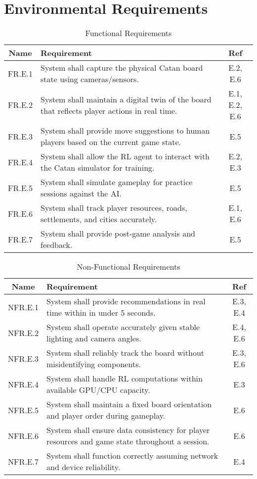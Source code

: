 \documentclass{article}
\begin{document}
\section*{Environmental Requirements}
\begin{table}[h!]
    \centering
    \begin{tabular}{|c|p{10cm}|c|}
    \hline
    \textbf{Name} & \textbf{Requirement} & \textbf{Ref} \\
    \hline
    FR.E.1 & System shall capture the physical Catan board state using cameras/sensors. & E.2, E.6 \\
    \hline
    FR.E.2 & System shall maintain a digital twin of the board that reflects player actions in real time. & E.1, E.2, E.6 \\
    \hline
    FR.E.3 & System shall provide move suggestions to human players based on the current game state. & E.5 \\
    \hline
    FR.E.4 & System shall allow the RL agent to interact with the Catan simulator for training. & E.2, E.3 \\
    \hline
    FR.E.5 & System shall simulate gameplay for practice sessions against the AI. & E.5 \\
    \hline
    FR.E.6 & System shall track player resources, roads, settlements, and cities accurately. & E.1, E.6 \\
    \hline
    FR.E.7 & System shall provide post-game analysis and feedback. & E.5 \\
    \hline
    \end{tabular}
    \caption{Functional Requirements}
    \label{tab:fr}
    \end{table}
    
    
    \begin{table}[h!]
    \centering
    \begin{tabular}{|c|p{10cm}|c|}
    \hline
    \textbf{Name} & \textbf{Requirement} & \textbf{Ref} \\
    \hline
    NFR.E.1 & System shall provide recommendations in real time within in under 5 seconds. & E.3, E.4 \\
    \hline
    NFR.E.2 & System shall operate accurately given stable lighting and camera angles. & E.4, E.6 \\
    \hline
    NFR.E.3 & System shall reliably track the board without misidentifying components. & E.3, E.6 \\
    \hline
    NFR.E.4 & System shall handle RL computations within available GPU/CPU capacity. & E.3 \\
    \hline
    NFR.E.5 & System shall maintain a fixed board orientation and player order during gameplay. & E.6 \\
    \hline
    NFR.E.6 & System shall ensure data consistency for player resources and game state throughout a session. & E.6 \\
    \hline
    NFR.E.7 & System shall function correctly assuming network and device reliability. & E.4 \\
    \hline
    \end{tabular}
    \caption{Non-Functional Requirements}
    \label{tab:nfr}
    \end{table}
    
\end{document}
